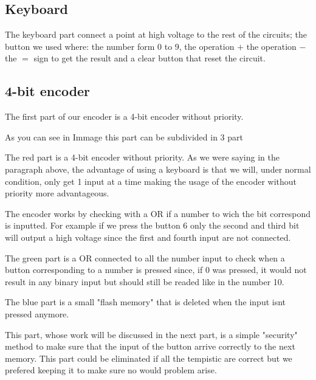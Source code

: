 \documentclass{article}
\begin{document}
\subsection{Keyboard}

The keyboard part connect a point at high voltage to the rest of the circuits; the button we used where: the number form 0 to 9, the operation $+$ the operation $-$ the $=$ sign to get the result and a clear button that reset the circuit.




\subsection{4-bit encoder}
The first part of our encoder is a 4-bit encoder without priority. 


As you can see in Immage %
this part can be subdivided in 3 part

\vspace{3mm}

The red part is a 4-bit encoder without priority. As we were saying in the paragraph above, the advantage of using a keyboard is that we will, under normal condition, %
 only get 1 input at a time making the usage of the encoder without priority more advantageous. 

The encoder works by checking with a OR if a number to wich the bit correspond is inputted. 
For example if we press the button 6 only the second and third bit will output a high voltage since the first and fourth input are not connected.

\vspace{3mm}

The green part is a OR connected to all the number input to check when a button corresponding to a number is pressed since, if 0 was pressed, it would not result in any binary input but should still be readed like in the number 10. 

\vspace{3mm}

The blue part is a small "flash memory" that is deleted when the input isnt pressed anymore. 

This part, whose work will be discussed in the next part, is a simple "security" method to make sure that the input of the button arrive correctly to the next memory. 
This part could be eliminated if all the tempistic are correct but we prefered keeping it to make sure no would problem arise.
\end{document}
